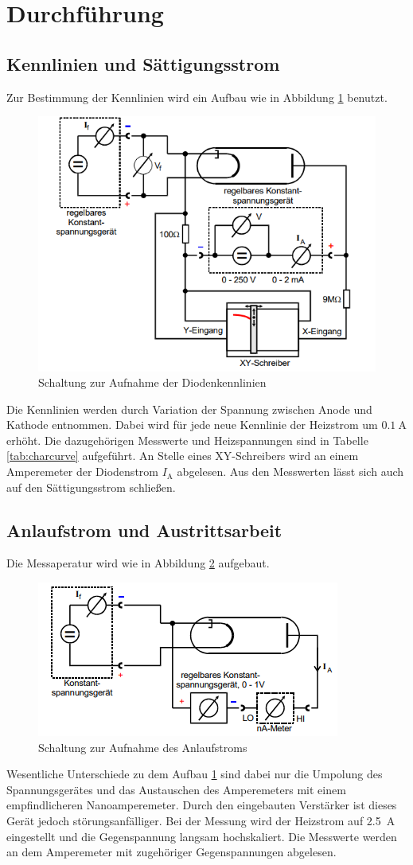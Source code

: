 \section{Durchführung}
\label{sec:Durchführung}
\subsection{Kennlinien und Sättigungsstrom}
Zur Bestimmung der Kennlinien wird ein Aufbau wie in Abbildung \ref{fig:aufbaua} benutzt.
\begin{figure}
    \centering
    \caption{Schaltung zur Aufnahme der Diodenkennlinien \cite{v504}}
    \label{fig:aufbaua}
    \includegraphics[width = 0.5 \textwidth]{pics/Aufbaua.png}
\end{figure}
Die Kennlinien werden durch Variation der Spannung zwischen Anode und Kathode entnommen. Dabei wird für jede neue Kennlinie der Heizstrom um $\SI{0.1}{\ampere}$ erhöht.
Die dazugehörigen Messwerte und Heizspannungen sind in Tabelle \ref{tab:charcurve} aufgeführt. 
An Stelle eines XY-Schreibers wird an einem Amperemeter der Diodenstrom $I_\text{A}$ abgelesen.
Aus den Messwerten lässt sich auch auf den Sättigungsstrom schließen.

\subsection{Anlaufstrom und Austrittsarbeit}
Die Messaperatur wird wie in Abbildung \ref{fig:aufbauc} aufgebaut.
\begin{figure}
    \centering
    \caption{Schaltung zur Aufnahme des Anlaufstroms \cite{v504}}
    \label{fig:aufbauc}
    \includegraphics[width = 0.5 \textwidth]{pics/Aufbauc.png}
\end{figure}
Wesentliche Unterschiede zu dem Aufbau \ref{fig:aufbaua} sind dabei nur die Umpolung des Spannungsgerätes und das Austauschen des Amperemeters mit einem empfindlicheren Nanoamperemeter. Durch den eingebauten Verstärker ist dieses Gerät jedoch störungsanfälliger.
Bei der Messung wird der Heizstrom auf \SI{2.5}{\ampere} eingestellt und die Gegenspannung langsam hochskaliert. Die Messwerte werden an dem Amperemeter mit zugehöriger Gegenspannungen abgelesen.
